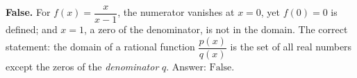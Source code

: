 \textbf{False.} For $f(x)=\dfrac{x}{x-1}$, the numerator vanishes at $x=0$, yet $f(0)=0$ is defined; and $x=1$, a zero of the denominator, is not in the domain. The correct statement: the domain of a rational function $\dfrac{p(x)}{q(x)}$ is the set of all real numbers except the zeros of the \emph{denominator} $q$. Answer: $\boxed{\text{False}}$.

